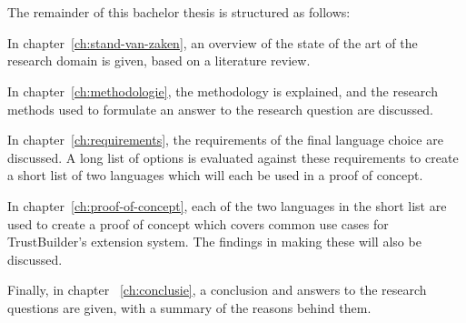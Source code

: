 \section{}%
\label{sec:opzet-bachelorproef}

The remainder of this bachelor thesis is structured as follows:

In chapter~\ref{ch:stand-van-zaken}, an overview of the state of the art of the research domain is given, based on a literature review.

In chapter~\ref{ch:methodologie}, the methodology is explained, and the research methods used to formulate an answer to the research question are discussed.

In chapter~\ref{ch:requirements}, the requirements of the final language choice are discussed. A long list of options is evaluated against these requirements to create a short list of two languages which will each be used in a proof of concept.

In chapter~\ref{ch:proof-of-concept}, each of the two languages in the short list are used to create a proof of concept which covers common use cases for TrustBuilder's extension system. The findings in making these will also be discussed.

Finally, in chapter ~\ref{ch:conclusie}, a conclusion and answers to the research questions are given, with a summary of the reasons behind them.
